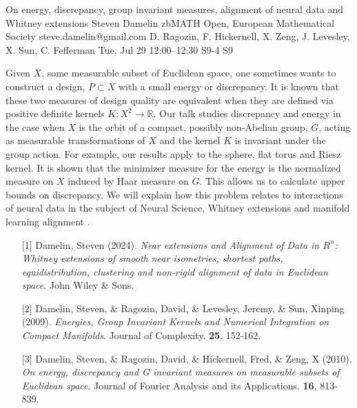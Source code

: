 \begin{talk}
  {On energy, discrepancy, group  invariant measures, alignment of neural data and Whitney extensions}%
  {Steven Damelin}%
  {zbMATH Open, European Mathematical Society}%
  {steve.damelin@gmail.com}%
  {D. Ragozin, F. Hickernell, X. Zeng, J. Levesley, X. Sun, C. Fefferman}%
  {}%
  {Tue, Jul 29 12:00–12:30}%
  {S9-4}%
  {S9}%
  
				
			
Given $X$, some measurable subset of Euclidean space, one sometimes wants to construct a design, $P\subset X$ with a small energy or discrepancy. It is known that these two measures of design quality are equivalent when they are defined via positive definite kernels $K:X^2\to \mathbb R$. Our talk studies discrepancy and energy in the case when $X$ is the orbit of a compact, possibly non-Abelian group, $G$, acting as measurable transformations of $X$ and the kernel $K$ is invariant under the group action. For example, our results apply to the sphere, flat torus and Riesz kernel. It is shown that the minimizer measure for the energy is the normalized measure on $X$ induced by Haar measure on $G$. This allows us to calculate upper bounds on discrepancy. We will explain how this problem relates to interactions of neural data in the subject of Neural Science, Whitney extensions and manifold learning alignment . 


\medskip

\begin{enumerate}
	\item[{[1]}] Damelin, Steven (2024). {\it Near extensions and Alignment of Data in $R^n$: Whitney extensions of smooth near isometries, shortest paths, equidistribution, clustering and non-rigid alignment of data in Euclidean space}. John Wiley \& Sons.
        \item[{[2]}] Damelin, Steven, \& Ragozin, David, \& Levesley, Jeremy, \& Sun, Xinping (2009). {\it Energies, Group Invariant Kernels and Numerical Integration on Compact Manifolds}. Journal of Complexity. \textbf{25}, 152-162.
        \item[{[3]}] Damelin, Steven, \& Ragozin, David, \& Hickernell, Fred, \& Zeng, X (2010). {\it  On energy, discrepancy and G invariant measures on measurable subsets of Euclidean space}. Journal of Fourier Analysis and its Applications. \textbf{16}, 813-839.
\end{enumerate}

\end{talk}

